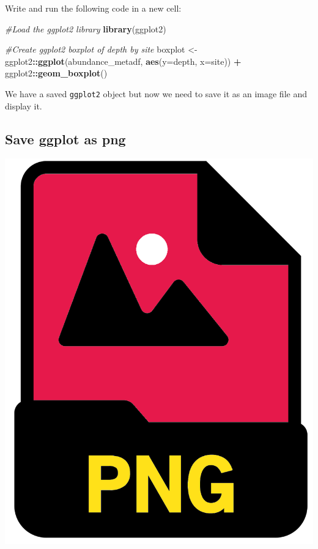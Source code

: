 \documentclass[
]{book}
\newenvironment{Shaded}{\begin{snugshade}}{\end{snugshade}}
\newcommand{\AttributeTok}[1]{\textcolor[rgb]{0.13,0.29,0.53}{#1}}
\newcommand{\CommentTok}[1]{\textcolor[rgb]{0.56,0.35,0.01}{\textit{#1}}}
\newcommand{\FunctionTok}[1]{\textcolor[rgb]{0.13,0.29,0.53}{\textbf{#1}}}
\newcommand{\NormalTok}[1]{#1}
\newcommand{\OtherTok}[1]{\textcolor[rgb]{0.56,0.35,0.01}{#1}}
\newcommand{\SpecialCharTok}[1]{\textcolor[rgb]{0.81,0.36,0.00}{\textbf{#1}}}
\begin{document}
Write and run the following code in a new cell:

\begin{Shaded}
\begin{Highlighting}[]
\CommentTok{\#Load the ggplot2 library}
\FunctionTok{library}\NormalTok{(ggplot2)}

\CommentTok{\#Create ggplot2 boxplot of depth by site}
\NormalTok{boxplot }\OtherTok{\textless{}{-}}\NormalTok{ ggplot2}\SpecialCharTok{::}\FunctionTok{ggplot}\NormalTok{(abundance\_metadf, }\FunctionTok{aes}\NormalTok{(}\AttributeTok{y=}\NormalTok{depth, }\AttributeTok{x=}\NormalTok{site)) }\SpecialCharTok{+}
\NormalTok{  ggplot2}\SpecialCharTok{::}\FunctionTok{geom\_boxplot}\NormalTok{()}
\end{Highlighting}
\end{Shaded}

We have a saved \texttt{ggplot2} object but now we need to save it as an image file and display it.

\hypertarget{save-ggplot-as-png}{%
\subsection{Save ggplot as png}\label{save-ggplot-as-png}}

\includegraphics{figures/png_file.png}
\end{document}
